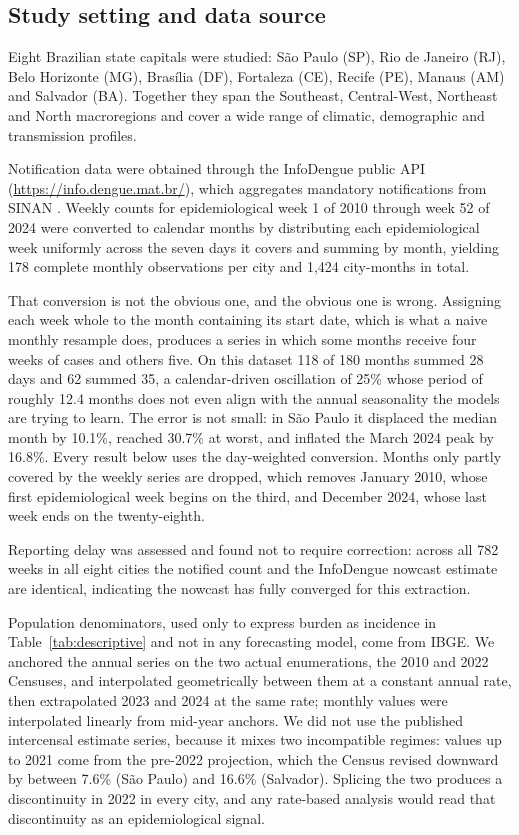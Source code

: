 \documentclass[11pt]{article}
\begin{document}
\subsection{Study setting and data source}

Eight Brazilian state capitals were studied: S\~ao Paulo (SP), Rio de Janeiro (RJ), Belo
Horizonte (MG), Bras\'ilia (DF), Fortaleza (CE), Recife (PE), Manaus (AM) and Salvador
(BA). Together they span the Southeast, Central-West, Northeast and North macroregions
and cover a wide range of climatic, demographic and transmission profiles.

Notification data were obtained through the InfoDengue public API
(\url{https://info.dengue.mat.br/}), which aggregates mandatory notifications from SINAN
\citep{Codeco2018infodengue}. Weekly counts for epidemiological week 1 of 2010 through
week 52 of 2024 were converted to calendar months by distributing each epidemiological
week uniformly across the seven days it covers and summing by month, yielding 178 complete
monthly observations per city and 1{,}424 city-months in total.

That conversion is not the obvious one, and the obvious one is wrong. Assigning each week
whole to the month containing its start date, which is what a naive monthly resample does,
produces a series in which some months receive four weeks of cases and others five. On
this dataset 118 of 180 months summed 28 days and 62 summed 35, a calendar-driven
oscillation of 25\% whose period of roughly 12.4 months does not even align with the
annual seasonality the models are trying to learn. The error is not small: in S\~ao Paulo
it displaced the median month by 10.1\%, reached 30.7\% at worst, and inflated the March
2024 peak by 16.8\%. Every result below uses the day-weighted conversion. Months only
partly covered by the weekly series are dropped, which removes January 2010, whose first
epidemiological week begins on the third, and December 2024, whose last week ends on the
twenty-eighth.

Reporting delay was assessed and found not to require correction: across all 782 weeks in
all eight cities the notified count and the InfoDengue nowcast estimate are identical,
indicating the nowcast has fully converged for this extraction.

Population denominators, used only to express burden as incidence in
Table~\ref{tab:descriptive} and not in any forecasting model, come from IBGE. We anchored
the annual series on the two actual enumerations, the 2010 and 2022 Censuses, and
interpolated geometrically between them at a constant annual rate, then extrapolated 2023
and 2024 at the same rate; monthly values were interpolated linearly from mid-year
anchors. We did not use the published intercensal estimate series, because it mixes two
incompatible regimes: values up to 2021 come from the pre-2022 projection, which the
Census revised downward by between 7.6\% (S\~ao Paulo) and 16.6\% (Salvador). Splicing
the two produces a discontinuity in 2022 in every city, and any rate-based analysis would
read that discontinuity as an epidemiological signal.
\end{document}
